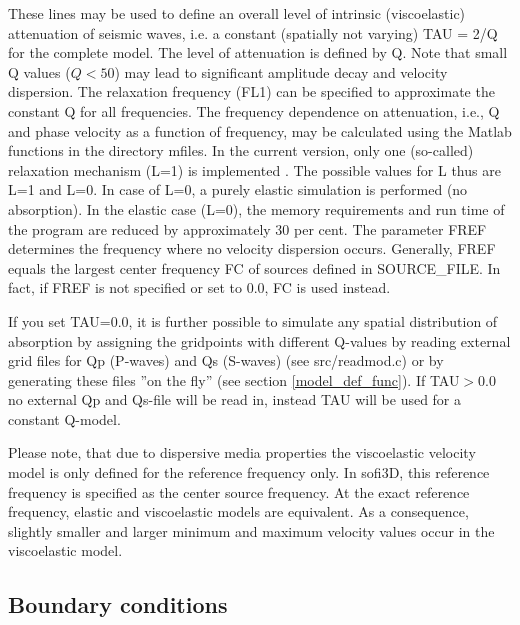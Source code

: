 \documentclass{hitec}
\begin{document}
These lines may be used to define an overall level of intrinsic (viscoelastic) attenuation of seismic waves, i.e. a constant (spatially not varying) TAU = 2/Q for the complete model. The level of attenuation is defined by Q. Note that small Q values ($Q<50$) may lead to significant amplitude decay and velocity dispersion. The relaxation frequency (FL1) can be specified to approximate the constant Q for all frequencies. The frequency dependence on attenuation, i.e., Q and phase velocity as a function  of frequency, may be calculated using the Matlab functions in the directory mfiles.
In the current version, only one (so-called) relaxation mechanism (L=1) is implemented \cite{bohlen:98,blanch:95,bohlen:02}. The possible values for L thus are L=1 and L=0. In case of L=0, a purely elastic simulation is performed (no absorption). In the elastic case (L=0), the memory requirements and run time of the program are reduced by approximately 30 per cent. The parameter FREF determines the frequency where no velocity dispersion occurs. Generally, FREF equals the largest center frequency FC of sources defined in SOURCE\_FILE. In fact, if FREF is not specified or set to 0.0, FC is used instead.

If you set TAU=0.0, it is further possible to simulate any spatial distribution of absorption by assigning the gridpoints with different Q-values by reading external grid files for Qp (P-waves) and Qs (S-waves) (see src/readmod.c) or by generating these files ''on the fly'' (see section \ref{model_def_func}). If TAU$>$0.0 no external Qp and Qs-file will be read in, instead TAU will be used for a constant Q-model.

Please note, that due to dispersive media properties the viscoelastic velocity model is only defined for the reference frequency only. In sofi3D, this reference frequency is specified as the center source frequency. At the exact reference frequency, elastic and viscoelastic models are equivalent. As a consequence, slightly smaller and larger minimum and maximum velocity values occur in the viscoelastic model.


\subsection{Boundary conditions}
\label{abs}
\end{document}
